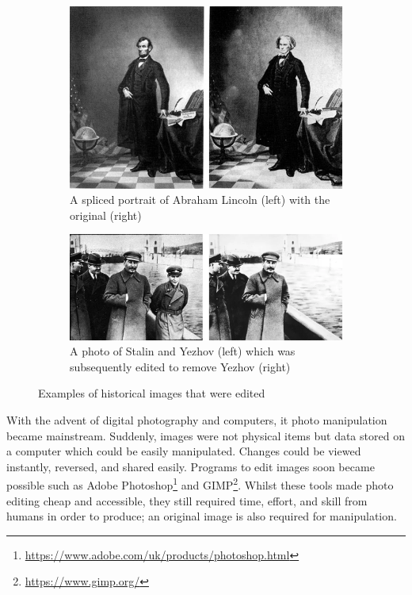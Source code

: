 \begin{figure}[h]
    \centering
    \begin{subfigure}{0.45\textwidth}
            \includegraphics[width=\textwidth]{dissertation//figures/lincoln1960.jpg}
            \caption{A spliced portrait of Abraham Lincoln (left) with the original (right)\cite{singh2018art}}
            \label{fig:lincoln}
    \end{subfigure}
    \begin{subfigure}{0.45\textwidth}
        \includegraphics[width=\textwidth]{dissertation//figures/stalin.png}
        \caption{A photo of Stalin and Yezhov (left) which was subsequently edited to remove Yezhov (right)}
        \label{fig:stalin-yezhov}
    \end{subfigure}
    \caption{Examples of historical images that were edited}
    \label{fig:edited-images}
\end{figure}

With the advent of digital photography and computers, it photo manipulation became mainstream. Suddenly, images were not physical items but data stored on a computer which could be easily manipulated. Changes could be viewed instantly, reversed, and shared easily. Programs to edit images soon became possible such as Adobe Photoshop\footnote{\url{https://www.adobe.com/uk/products/photoshop.html}} and GIMP\footnote{\url{https://www.gimp.org/}}. Whilst these tools made photo editing cheap and accessible, they still required time, effort, and skill from humans in order to produce; an original image is also required for manipulation.

